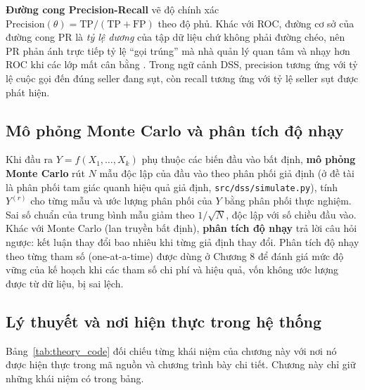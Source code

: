 \textbf{Đường cong Precision-Recall} vẽ độ chính xác $\text{Precision}(\theta) = \text{TP}/(\text{TP} + \text{FP})$ theo độ phủ. Khác với ROC, đường cơ sở của đường cong PR là \emph{tỷ lệ dương} của tập dữ liệu chứ không phải đường chéo, nên PR phản ánh trực tiếp tỷ lệ ``gọi trúng'' mà nhà quản lý quan tâm và nhạy hơn ROC khi các lớp mất cân bằng \cite{saito2015}. Trong ngữ cảnh DSS, precision tương ứng với tỷ lệ cuộc gọi đến đúng seller đang sụt, còn recall tương ứng với tỷ lệ seller sụt được phát hiện.

\subsection{Mô phỏng Monte Carlo và phân tích độ nhạy}
Khi đầu ra $Y = f(X_1, \dots, X_k)$ phụ thuộc các biến đầu vào bất định, \textbf{mô phỏng Monte Carlo} rút $N$ mẫu độc lập của đầu vào theo phân phối giả định (ở đề tài là phân phối tam giác quanh hiệu quả giả định, \texttt{src/dss/simulate.py}), tính $Y^{(r)}$ cho từng mẫu và ước lượng phân phối của $Y$ bằng phân phối thực nghiệm. Sai số chuẩn của trung bình mẫu giảm theo $1/\sqrt{N}$, độc lập với số chiều đầu vào. Khác với Monte Carlo (lan truyền bất định), \textbf{phân tích độ nhạy} \cite{saltelli2008} trả lời câu hỏi ngược: kết luận thay đổi bao nhiêu khi từng giả định thay đổi. Phân tích độ nhạy theo từng tham số (one-at-a-time) được dùng ở Chương 8 để đánh giá mức độ vững của kế hoạch khi các tham số chi phí và hiệu quả, vốn không ước lượng được từ dữ liệu, bị sai lệch.

\subsection{Lý thuyết và nơi hiện thực trong hệ thống}
Bảng~\ref{tab:theory_code} đối chiếu từng khái niệm của chương này với nơi nó được hiện thực trong mã nguồn và chương trình bày chi tiết. Chương này chỉ giữ những khái niệm có trong bảng.

